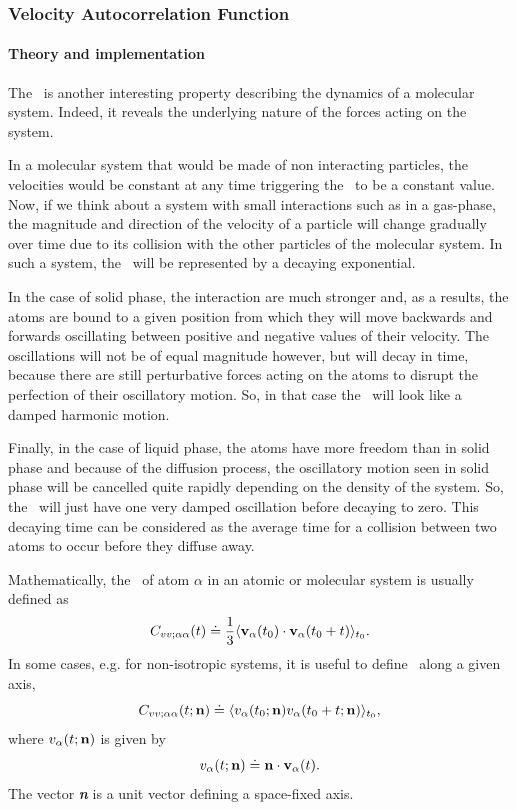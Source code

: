 \documentclass[a4paper,11pt]{report}
\begin{document}
\subsubsection{Velocity Autocorrelation Function}
\label{vacf}
\paragraph{Theory and implementation\\}
\label{vacf_theory}
The \VACF\ is another interesting property describing the dynamics of a 
molecular system. Indeed, it reveals the underlying nature of the forces acting on the system. 

In a molecular system that would be made of non interacting particles, the velocities would be constant at 
any time triggering the \VACF\ to be a constant value. Now, if we think about a system with small interactions such as in a
gas-phase, the magnitude and direction of the velocity of a particle will change gradually over time due to its 
collision with the other particles of the molecular system. In such a system, the \VACF\ will be represented by a
decaying exponential.

In the case of solid phase, the interaction are much stronger and, as a results, the atoms are bound to a given 
position from which they will move backwards and forwards oscillating between positive and negative values of 
their velocity. The oscillations will not be of equal magnitude however, but will decay in time, because there 
are still perturbative forces acting on the atoms to disrupt the perfection of their oscillatory motion. So, in 
that case the \VACF\ will look like a damped harmonic motion.

Finally, in the case of liquid phase, the atoms have more freedom than in solid phase and because of the diffusion 
process, the oscillatory motion seen in solid phase will be cancelled quite rapidly depending on the density of the
system. So, the \VACF\ will just have one very damped oscillation before decaying to zero. This decaying time can be
considered as the average time for a collision between two atoms to occur before they diffuse away.

Mathematically, the \VACF\ of atom $\alpha$ in an atomic or molecular system is usually defined as
\begin{equation}
\label{eq:vacf}
C_{vv ; \alpha\alpha}(t) \doteq
\frac{1}{3}\langle {\bf v}_\alpha(t_0)\cdot{\bf v}_\alpha(t_0+t)\rangle_{t_0}.
\end{equation}
In some cases, e.g. for non-isotropic systems, it is useful to define \VACF\ along a given axis,
\begin{equation}
\label{eq:vacf_n}
C_{vv ; \alpha\alpha}(t;{\bf n}) \doteq
\langle v_\alpha(t_0;{\bf n})v_\alpha(t_0+t;{\bf n})\rangle_{t_0},
\end{equation}
where $v_\alpha(t;{\bf n})$ is given by
\begin{equation}
v_\alpha(t;{\bf n}) \doteq 
{\bf n}\cdot{\bf v}_{\alpha}(t).
\end{equation}
The vector \textit{\textbf{n}} is a unit vector defining a space-fixed axis.
\end{document}
